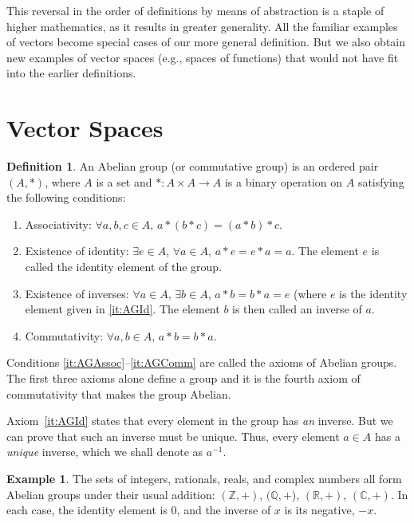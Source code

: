 \documentclass[svgnames]{article}
\theoremstyle{definition}
\newtheorem{Definition}[Theorem]{Definition}
\newtheorem{Example}[Theorem]{Example}
\theoremstyle{remark}
\newcommand{\newterm}[1]{{\color{alertcolor} #1}}
\begin{document}
This reversal in the order of definitions by means of abstraction is a staple of higher mathematics, as it results in greater generality. All the familiar examples of vectors become special cases of our more general definition. But we also obtain new examples of vector spaces (e.g., spaces of functions) that would not have fit into the earlier definitions.

\section{Vector Spaces}\label{sec:VecSpaces}
\begin{Definition}
An \newterm{Abelian group} (or \newterm{commutative group}) is an ordered pair $(A, *)$, where $A$ is a set and $* \colon A \times A \to A$ is a binary operation on $A$ satisfying the following conditions:
\begin{enumerate}
\item\label{it:AGAssoc} {Associativity}: $\forall a, b, c \in A$, $a*(b*c) = (a*b)*c$.
\item\label{it:AGId} {Existence of identity}: $\exists e \in A$, $\forall a \in A$, $a * e = e * a = a$. The element $e$ is called the \newterm{identity element} of the group.
\item\label{it:AGInv} {Existence of inverses}: $\forall a \in A$, $\exists b \in A$, $a * b = b * a = e$ (where $e$ is the identity element given in \ref{it:AGId}. The element $b$ is then called an \newterm{inverse} of $a$.
\item\label{it:AGComm} {Commutativity}: $\forall a, b \in A$, $a * b = b * a$.
\end{enumerate}
\end{Definition}
Conditions \ref{it:AGAssoc}--\ref{it:AGComm} are called the axioms of Abelian groups. The first three axioms alone define a \newterm{group} and it is the fourth axiom of commutativity that makes the group Abelian.

Axiom~\ref{it:AGId} states that every element in the group has \emph{an} inverse. But we can prove that such an inverse must be unique. Thus, every element $a \in A$ has a \emph{unique} inverse, which we shall denote as $a^{-1}$.

\begin{Example}\label{ex:AbGrpZQRC+}
The sets of integers, rationals, reals, and complex numbers all form Abelian groups under their usual addition: $(\mathbb Z, +)$, $(\mathbb Q, +$), $(\mathbb R, +)$, $(\mathbb C, +)$. In each case, the identity element is $0$, and the inverse of $x$ is its negative, $-x$.
\end{Example}
\end{document}
